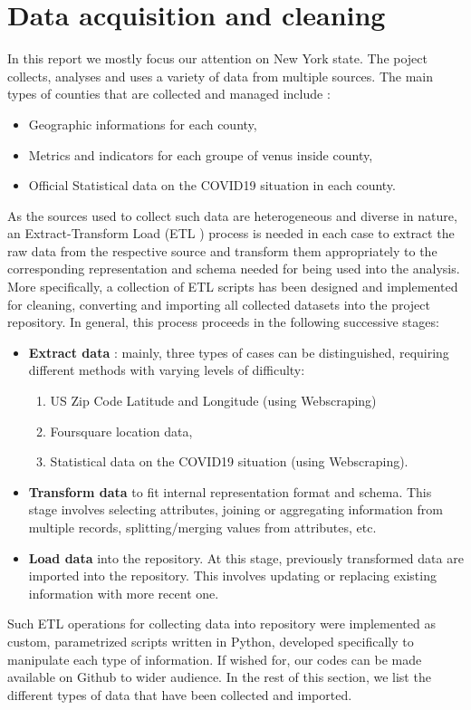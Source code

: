 \documentclass{article}
\begin{document}
\section{Data acquisition and cleaning}
In this report we mostly focus our attention on New York state.  The poject collects, analyses and uses a variety of data from multiple sources. The main types of
counties that are collected and managed include :
\begin{itemize}
\item Geographic  informations for each county,
\item Metrics and indicators for each groupe of venus inside county,
\item  Official Statistical data on the COVID19 situation in each county.\\
\end{itemize}

As the sources used to collect such data are heterogeneous and diverse in nature, an Extract-Transform Load (ETL ) process is needed in each case to extract the raw data from the respective source and transform them appropriately to the corresponding representation and schema needed for being used into the analysis.\\


More specifically, a collection of ETL scripts has been designed and implemented for
cleaning,  converting and importing all collected datasets into the project repository. In general, this process proceeds in the following successive stages:
\begin{itemize}
\item \textbf{Extract data} :  mainly, three types of cases can be
distinguished, requiring different methods with varying levels of difficulty: 
\begin{enumerate}
\item US Zip Code Latitude and Longitude (using Webscraping)
\item Foursquare location data,
\item Statistical data on the COVID19 situation  (using Webscraping).
\end{enumerate}
\item  \textbf{Transform data }to fit internal representation format and schema. This stage involves selecting attributes, joining or aggregating information from multiple
records, splitting/merging values from attributes, etc.
\item  \textbf{Load data} into the repository. At this stage, previously transformed data are imported into the repository. This involves updating or replacing existing information with more recent one.\\
\end{itemize}
Such ETL operations for collecting data into  repository were implemented as custom, parametrized scripts written in Python,  developed specifically to manipulate each type of information.   If wished for, our codes can be made available on Github to wider audience.  In the rest of this section, we list the different types of data that have been collected and imported.
\end{document}
